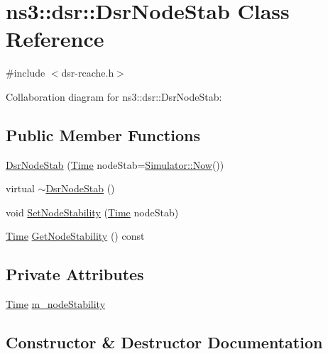 \hypertarget{classns3_1_1dsr_1_1DsrNodeStab}{}\section{ns3\+:\+:dsr\+:\+:Dsr\+Node\+Stab Class Reference}
\label{classns3_1_1dsr_1_1DsrNodeStab}


{\ttfamily \#include $<$dsr-\/rcache.\+h$>$}



Collaboration diagram for ns3\+:\+:dsr\+:\+:Dsr\+Node\+Stab\+:
\subsection*{Public Member Functions}
\begin{DoxyCompactItemize}
\item 
\hyperlink{classns3_1_1dsr_1_1DsrNodeStab_afa0a358dc79d5bc111448967f9d4614f}{Dsr\+Node\+Stab} (\hyperlink{classns3_1_1Time}{Time} node\+Stab=\hyperlink{classns3_1_1Simulator_ac3178fa975b419f7875e7105be122800}{Simulator\+::\+Now}())
\item 
virtual \hyperlink{classns3_1_1dsr_1_1DsrNodeStab_ab62315605a9d733940f1f094547ff902}{$\sim$\+Dsr\+Node\+Stab} ()
\item 
void \hyperlink{classns3_1_1dsr_1_1DsrNodeStab_a883435e6c2d65cd7089e54a30d7b03b5}{Set\+Node\+Stability} (\hyperlink{classns3_1_1Time}{Time} node\+Stab)
\item 
\hyperlink{classns3_1_1Time}{Time} \hyperlink{classns3_1_1dsr_1_1DsrNodeStab_a377f687c26c8c0f3780024b359c57d72}{Get\+Node\+Stability} () const 
\end{DoxyCompactItemize}
\subsection*{Private Attributes}
\begin{DoxyCompactItemize}
\item 
\hyperlink{classns3_1_1Time}{Time} \hyperlink{classns3_1_1dsr_1_1DsrNodeStab_a2b6eb24deba1383c90c5e67fd40b3594}{m\+\_\+node\+Stability}
\end{DoxyCompactItemize}


\subsection{Constructor \& Destructor Documentation}
